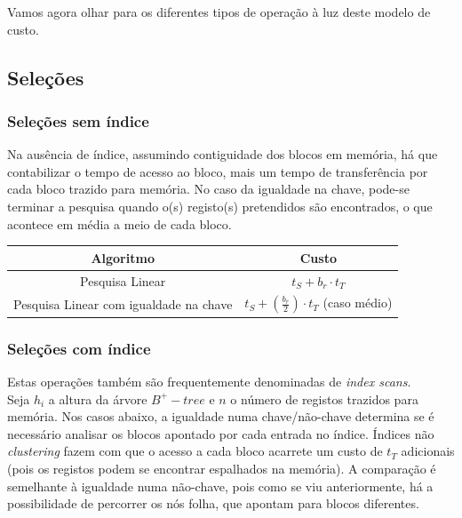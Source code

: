 \documentclass[oneside]{book}
\theoremstyle{definition}
\begin{document}
Vamos agora olhar para os diferentes tipos de operação à luz deste modelo de custo.

\subsection{Seleções}

\subsubsection*{Seleções sem índice}

Na ausência de índice, assumindo contiguidade dos blocos em memória, há que contabilizar o tempo de acesso ao bloco, mais um tempo de transferência por cada bloco trazido para memória. No caso da igualdade na chave, pode-se terminar a pesquisa quando o(s) registo(s) pretendidos são encontrados, o que acontece em média a meio de cada bloco.

\begin{table}[H]
    \centering
    \begin{tabular}{c|c}
       Algoritmo                              & Custo  \\ \hline
      Pesquisa Linear                        &   $t_S + b_r \cdot t_T$     \\ \hline
     Pesquisa Linear com igualdade na chave &     $t_S + (\frac{b_r}{2}) \cdot t_T$ (caso médio)  \\ \hline
    \end{tabular}
\end{table}

\subsubsection*{Seleções com índice}

Estas operações também são frequentemente denominadas de \textit{index scans}. \\
Seja $h_i$ a altura da árvore $B^{+}-tree$ e $n$ o número de registos trazidos para memória. Nos casos abaixo, a igualdade numa chave/não-chave determina se é necessário analisar os blocos apontado por cada entrada no índice. Índices não \textit{clustering} fazem com que o acesso a cada bloco acarrete um custo de $t_T$ adicionais (pois os registos podem se encontrar espalhados na memória). A comparação é semelhante à igualdade numa não-chave, pois como se viu anteriormente, há a possibilidade de percorrer os nós folha, que apontam para blocos diferentes.
\end{document}
